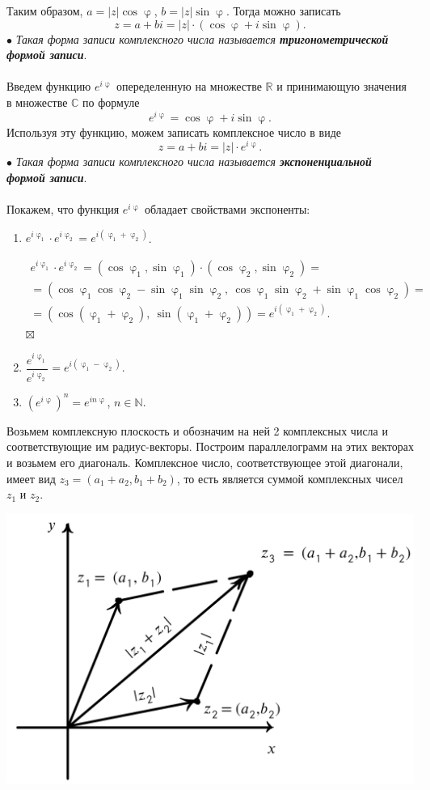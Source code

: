 \documentclass[a4paper, 12pt]{article}
\newenvironment{Proof} %
{\par\noindent{$\blacklozenge$}} %
{\hfill$\scriptstyle\boxtimes$}
\newcommand{\Rm}{\mathbb{R}}
\newcommand{\Cm}{\mathbb{C}}
\newcommand{\N}{\mathbb{N}}
\renewcommand{\varphi}{\upvarphi}
\newcommand\ef[1]{e^{i#1}}
\begin{document}
Таким образом, $a = |z|\cos \varphi$, $b = |z|\sin\varphi$. Тогда можно записать $$z = a + bi = |z|\cdot (\cos \varphi + i\sin\varphi).$$
$\bullet$ \textit{Такая форма записи комплексного числа называется \textbf{тригонометрической формой записи}}.\\\\
Введем функцию $e^{i\varphi}$ опеределенную на множестве $\Rm$ и принимающую значения в множестве $\Cm$ по формуле $$e^{i\varphi} = \cos\varphi + i\sin\varphi.$$
Используя эту функцию, можем записать комплексное число в виде $$z = a+bi = |z|\cdot e^{i\varphi}.$$
$\bullet$ \textit{Такая форма записи комплексного числа называется \textbf{экспоненциальной формой записи}}.\\\\
Покажем, что функция $e^{i\varphi}$ обладает свойствами экспоненты:
\begin{enumerate}
	\item $\ef{\varphi_1}\cdot \ef{\varphi_2} = \ef{(\varphi_1 + \varphi_2)}$.
	\begin{Proof}
		\begin{multline*}
			\ef{\varphi_1}\cdot \ef{\varphi_2} = (\cos\varphi_1, \sin\varphi_1)\cdot (\cos\varphi_2, \sin\varphi_2) =\\= (\cos\varphi_1\cos\varphi_2-\sin\varphi_1\sin\varphi_2,\ \cos\varphi_1\sin\varphi_2 + \sin\varphi_1\cos\varphi_2)=\\=(\cos(\varphi_1 + \varphi_2),\ \sin(\varphi_1 + \varphi_2)) = \ef{(\varphi_1 + \varphi_2)}.
		\end{multline*}
	\end{Proof}
\item $\dfrac{\ef{\varphi_1}}{\ef{\varphi_2}} = \ef{(\varphi_1 - \varphi_2)}.$
\item $(\ef{\varphi})^n = \ef{n\varphi}$, $n\in \N$.
\end{enumerate}
\noindent
\parbox[b][4cm][t]{90mm}{
	Возьмем комплексную плоскость и обозначим на ней 2 комплексных числа и соответствующие им радиус-векторы. Построим параллелограмм на этих векторах и возьмем его диагональ. Комплексное число, соответствующее этой диагонали, имеет вид $z_3 = (a_1 + a_2, b_1 + b_2)$, то есть является суммой комплексных чисел $z_1$ и $z_2$.
	}
\hfill
\parbox[b][5cm][t]{70mm}{
	\includegraphics[scale=0.36]{images/004.png}}\\\\
\end{document}
